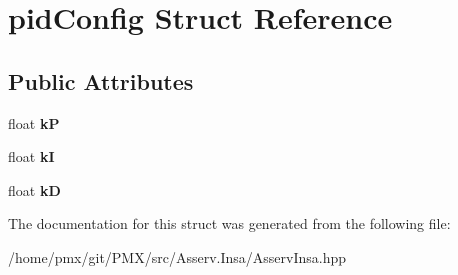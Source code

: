 \hypertarget{structpidConfig}{}\section{pid\+Config Struct Reference}
\label{structpidConfig}
\subsection*{Public Attributes}
\begin{DoxyCompactItemize}
\item 
\mbox{\label{structpidConfig_a45e555fd2d81d9d64a6d2acff6255bda}} 
float {\bfseries kP}
\item 
\mbox{\label{structpidConfig_a346fe2170d6af936f2fa3990db4bd7d2}} 
float {\bfseries kI}
\item 
\mbox{\label{structpidConfig_a33332e389df67d2cfefcdea639ea3c07}} 
float {\bfseries kD}
\end{DoxyCompactItemize}


The documentation for this struct was generated from the following file\+:\begin{DoxyCompactItemize}
\item 
/home/pmx/git/\+P\+M\+X/src/\+Asserv.\+Insa/Asserv\+Insa.\+hpp\end{DoxyCompactItemize}
